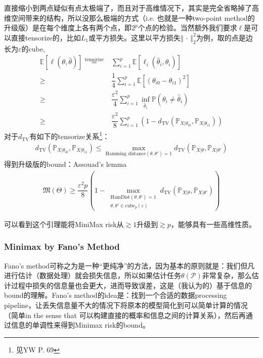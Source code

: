 \documentclass[11pt,a4paper]{ctexart}
\numberwithin{equation}{section}%
\begin{document}
直接缩小到两点疑似有点太极端了，而且对于高维情况下，其实是完全省略掉了高维空间带来的结构，所以没那么极端的方式（i.e. 也就是一种two-point method的升级版）是在每个维度上各有两个点，即$ 2^p $个点的检验。当然额外我们要求$ \ell $是可以直接tensorize的，比如$ L_1 $或平方损失。这里以平方损失$ \left\Vert \, \cdot \,  \right\Vert _2^2 $为例，取的点是边长为$ \varepsilon  $的cube,
\begin{align*}
    \mathbb{E}\left[ \ell(\theta ,\hat{\theta }) \right] \mathop{ = }\limits^{\text{tensorize}}  & \sum_{i=1}^p \mathbb{E}\left[ \ell_i(\hat{\theta }_i,\theta _i) \right]  \\
    \geq & \dfrac{ 1 }{ 4 } \sum_{i=1}^p \mathbb{E}\left[ (\theta _{i0}-\theta _{i1})^2 \right] \\
    \geq & \dfrac{ \varepsilon ^2 }{ 4 } \sum_{i=1}^p \inf_{\hat{\theta }_i} \mathbb{P}\left( \theta _i\neq \hat{\theta }_i \right)\\
    \geq & \dfrac{ \varepsilon ^2 }{ 8 } \sum_{i=1}^p \left(1- d_{\mathrm{ TV } }(\mathbb{P}_{X|\theta _{i0}},\mathbb{P}_{X|\theta _{i1}}) \right)
\end{align*}
对于$ d_{\mathrm{ TV } } $有如下的tensorize关系\footnote{见YW P. 69}：
\begin{align*}
    d_{\mathrm{ TV } }(\mathbb{P}_{X|\theta _{i0}},\mathbb{P}_{X|\theta _{i1}}) \leq \mathop{ \max  }\limits_{\text{Hamming distance}(\theta ,\theta ')=1}d_{\mathrm{ TV } }(\mathbb{P}_{X|\theta },\mathbb{P}_{X|\theta '})
\end{align*}
得到升级版的bound：Assouad's lemma
\begin{align*}
    \mathfrak{M}(\Theta)\geq \dfrac{ \varepsilon ^2p }{ 8 } \left(1- \mathop{ \max  }\limits_{\substack{\text{HamDist}(\theta ,\theta ')=1\\\theta ,\theta '\in \text{cube}_p(\varepsilon )}}d_{\mathrm{ TV } }(\mathbb{P}_{X|\theta },\mathbb{P}_{X|\theta '}) \right)
\end{align*}

可以看到这个引理能将MiniMax risk从$ \gtrsim 1 $升级到$ \gtrsim p $，能够具有一些高维性质。




\subsubsection{Minimax by Fano's Method}

Fano's method可称之为是一种“更纯净”的方法，因为基本的原则就是：我们但凡进行估计（数据处理）就会损失信息，所以如果估计任务$ \theta (\mathcal{P}) $非常复杂，那么估计过程中损失的信息量也会更大，进而导致误差，这是（我认为的）基于信息的bound的理解。Fano's method的idea是：找到一个合适的数据processing pipeline，让丢失信息量不大的情况下将原本的模型简化到可以简单计算的情况（简单in the sense that 可以构建直接的概率和信息之间的计算关系），然后再通过信息的单调性来得到Minimax risk的bound。
\end{document}
